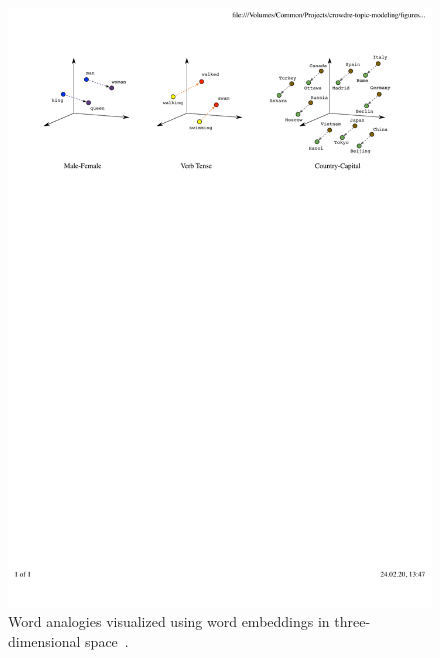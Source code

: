 \begin{figure}[ht]
  \centering
    \includegraphics[width=\textwidth]{figures/word-embedding-relationships.pdf}
    \caption{Word analogies visualized using word embeddings in three-dimensional space \,\cite{google_embeddings_figure}.}
    \label{fig:word_emb_relationships}
\end{figure}
\FloatBarrier

